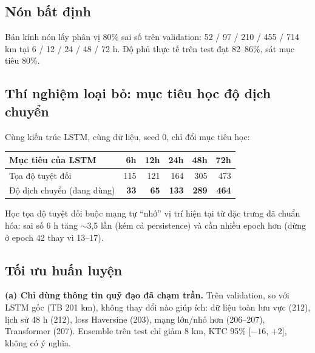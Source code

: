 \documentclass[12pt,a4paper]{article}
\begin{document}
\subsection{Nón bất định}
Bán kính nón lấy phân vị 80\% sai số trên validation: 52 / 97 / 210 / 455 / 714 km
tại 6 / 12 / 24 / 48 / 72 h. Độ phủ thực tế trên test đạt 82--86\%, sát mục tiêu 80\%.

\subsection{Thí nghiệm loại bỏ: mục tiêu học độ dịch chuyển}\label{sec:ablation}
Cùng kiến trúc LSTM, cùng dữ liệu, seed 0, chỉ đổi mục tiêu học:
\begin{table}[H]\centering
\begin{tabular}{lrrrrr}
\toprule
Mục tiêu của LSTM & 6h & 12h & 24h & 48h & 72h \\
\midrule
Tọa độ tuyệt đối & 115 & 121 & 164 & 305 & 473 \\
Độ dịch chuyển (đang dùng) & \textbf{33} & \textbf{65} & \textbf{133} & \textbf{289} & \textbf{464} \\
\bottomrule
\end{tabular}
\end{table}
Học tọa độ tuyệt đối buộc mạng tự ``nhớ'' vị trí hiện tại từ đặc trưng đã chuẩn
hóa: sai số 6 h tăng $\sim$3,5 lần (kém cả persistence) và cần nhiều epoch hơn
(dừng ở epoch 42 thay vì 13--17).

\subsection{Tối ưu huấn luyện}\label{sec:steering}
\textbf{(a) Chỉ dùng thông tin quỹ đạo đã chạm trần.} Trên validation, so với LSTM
gốc (TB 201 km), không thay đổi nào giúp ích: dữ liệu toàn lưu vực (212), lịch sử
48 h (212), loss Haversine (203), mạng lớn/nhỏ hơn (206--207), Transformer (207).
Ensemble trên test chỉ giảm 8 km, KTC 95\% [$-16$, $+2$], không có ý nghĩa.
\end{document}
